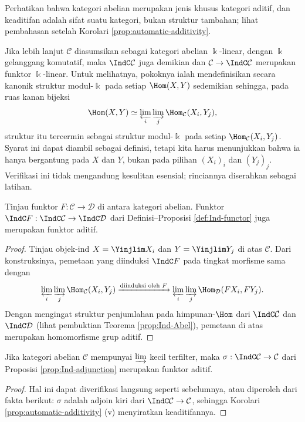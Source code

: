 Perhatikan bahwa kategori abelian merupakan jenis khusus kategori aditif, dan keaditifan adalah sifat suatu kategori, bukan struktur tambahan; lihat pembahasan setelah Korolari \ref{prop:automatic-additivity}.

\begin{remark}\label{rem:Ind-k-linear}
	Jika lebih lanjut $\mathcal{C}$ diasumsikan sebagai kategori abelian $\Bbbk$-linear, dengan $\Bbbk$ gelanggang komutatif, maka $\IndC\mathcal{C}$ juga demikian dan $\mathcal{C}\to\IndC\mathcal{C}$ merupakan funktor $\Bbbk$-linear. Untuk melihatnya, pokoknya ialah mendefinisikan secara kanonik struktur modul-$\Bbbk$ pada setiap $\Hom(X,Y)$ sedemikian sehingga, pada ruas kanan bijeksi
	\[ \Hom(X, Y) \simeq \varprojlim_i \varinjlim_j \Hom_{\mathcal{C}}(X_i, Y_j), \]
	struktur itu tercermin sebagai struktur modul-$\Bbbk$ pada setiap $\Hom_{\mathcal{C}}(X_i,Y_j)$. Syarat ini dapat diambil sebagai definisi, tetapi kita harus menunjukkan bahwa ia hanya bergantung pada $X$ dan $Y$, bukan pada pilihan $(X_i)_i$ dan $(Y_j)_j$. Verifikasi ini tidak mengandung kesulitan esensial; rinciannya diserahkan sebagai latihan.
\end{remark}

\begin{lemma}
	Tinjau funktor $F:\mathcal{C}\to\mathcal{D}$ di antara kategori abelian. Funktor $\IndC F:\IndC\mathcal{C}\to\IndC\mathcal{D}$ dari Definisi--Proposisi \ref{def:Ind-functor} juga merupakan funktor aditif.
\end{lemma}
\begin{proof}
	Tinjau objek-ind $X=\Yinjlim X_i$ dan $Y=\Yinjlim Y_j$ di atas $\mathcal{C}$. Dari konstruksinya, pemetaan yang diinduksi $\IndC F$ pada tingkat morfisme sama dengan
	\[ \varprojlim_i \varinjlim_j \Hom_{\mathcal{C}}(X_i, Y_j) \xrightarrow{\text{diinduksi oleh $F$}} \varprojlim_i \varinjlim_j \Hom_{\mathcal{D}}(FX_i, FY_j). \]
	Dengan mengingat struktur penjumlahan pada himpunan-$\Hom$ dari $\IndC\mathcal{C}$ dan $\IndC\mathcal{D}$ (lihat pembuktian Teorema \ref{prop:Ind-Abel}), pemetaan di atas merupakan homomorfisme grup aditif.
\end{proof}

\begin{lemma}
	Jika kategori abelian $\mathcal{C}$ mempunyai $\varinjlim$ kecil terfilter, maka $\sigma:\IndC\mathcal{C}\to\mathcal{C}$ dari Proposisi \ref{prop:Ind-adjunction} merupakan funktor aditif.
\end{lemma}
\begin{proof}
	Hal ini dapat diverifikasi langsung seperti sebelumnya, atau diperoleh dari fakta berikut: $\sigma$ adalah adjoin kiri dari $\IndC\mathcal{C}\to\mathcal{C}$, sehingga Korolari \ref{prop:automatic-additivity} (v) menyiratkan keaditifannya.
\end{proof}

